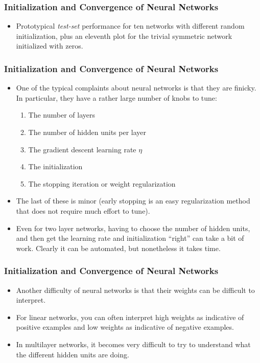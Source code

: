 \documentclass[trans]{beamer}
\begin{document}
\begin{frame}
  \frametitle{Initialization and Convergence of Neural Networks}
\begin{itemize}
\item
Prototypical
\emph{test-set} performance for ten networks with different random
initialization, plus an eleventh plot for the trivial symmetric
network initialized with zeros.
\end{itemize}
\end{frame}

\begin{frame}
  \frametitle{Initialization and Convergence of Neural Networks}
\begin{itemize}
\item
One of the typical complaints about neural networks is that they are
finicky.  In particular, they have a rather large number of knobs to
tune:
%
\begin{enumerate}
\item The number of layers
\item The number of hidden units per layer
\item The gradient descent learning rate $\eta$
\item The initialization
\item The stopping iteration or weight regularization
\end{enumerate}
%
\item The last of these is minor (early stopping is an easy regularization
method that does not require much effort to tune).
\item  Even for two layer networks, having to choose
the number of hidden units, and then get the learning rate and
initialization ``right'' can take a bit of work.  Clearly it can be
automated, but nonetheless it takes time.
\end{itemize}
\end{frame}

\begin{frame}
  \frametitle{Initialization and Convergence of Neural Networks}
\begin{itemize}
\item
Another difficulty of neural networks is that their weights can be
difficult to interpret. 
\item  For linear networks, you
can often interpret high weights as indicative of positive examples
and low weights as indicative of negative examples.  
\item In multilayer
networks, it becomes very difficult to try to understand what the
different hidden units are doing.  
\end{itemize}
\end{frame}
\end{document}
